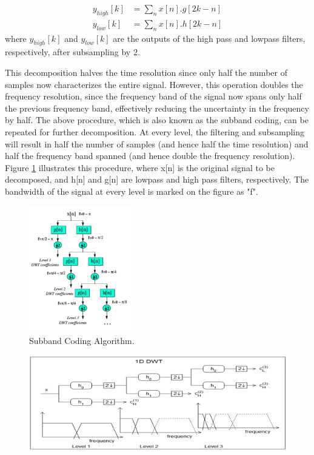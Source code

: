 \documentclass[12pt, a4paper, twoside]{report}
\begin{document}
\begin{align*}
y_{high}[k] &= \sum_{n} x[n].g[2k-n] \\ 
y_{low}[k] &= \sum_{n} x[n].h[2k-n]
\end{align*}
where $y_{high}[k]$ and $y_{low}[k]$ are the outputs of the high pass and lowpass filters, respectively, after subsampling by 2. 
\par
This decomposition halves the time resolution since only half the number of samples now characterizes the entire signal. However, this operation doubles the frequency resolution, since the frequency band of the signal now spans only half the previous frequency band, effectively reducing the uncertainty in the frequency by half. The above procedure, which is also known as the subband coding, can be repeated for further decomposition. At every level, the filtering and subsampling will result in half the number of samples (and hence half the time resolution) and half the frequency band spanned (and hence double the frequency resolution). Figure \ref{fig:subband-algorithm} illustrates this procedure, where x[n] is the original signal to be decomposed, and h[n] and g[n] are lowpass and high pass filters, respectively. The bandwidth of the signal at every level is marked on the figure as "f".

\begin{figure}[!h]
	\centering
	\includegraphics[width=0.4\textwidth]
	{images/chapter3/subband-algorithm}
	\caption{Subband Coding Algorithm.}
	\label{fig:subband-algorithm}
\end{figure}

\begin{figure}[!h]
	\centering
	\includegraphics[width=.8\textwidth]
	{images/chapter3/subband-algorithm-2}
	\caption{}
	\label{fig:subband-algorithm-2}
\end{figure}
\end{document}
